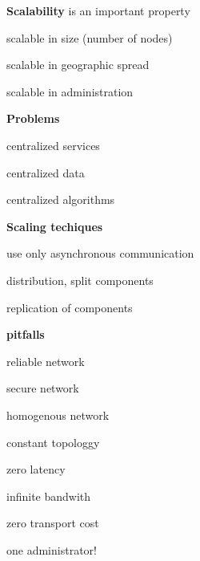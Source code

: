 \documentclass[ngerman,a4paper]{report}
\begin{document}
\textbf{Scalability} is an important property

\begin{compactitem}
\item scalable in size (number of nodes)
\item scalable in geographic spread
\item scalable in administration
\end{compactitem}

\textbf{Problems}

\begin{compactitem}
\item centralized services
\item centralized data
\item centralized algorithms
\end{compactitem}

\textbf{Scaling techiques}

\begin{compactitem}
\item use only asynchronous communication
\item distribution, split components
\item replication of components
\end{compactitem}

\textbf{pitfalls}

\begin{compactenum}
\item reliable network
\item secure network
\item homogenous network
\item constant topologgy
\item zero latency
\item infinite bandwith
\item zero transport cost
\item one administrator!
\end{compactenum}
\end{document}
